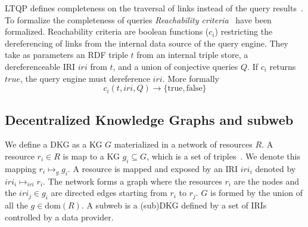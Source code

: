 LTQP defines completeness on the traversal of links instead of the query results~\cite{Hartig2012}.
To formalize the completeness of queries \emph{Reachability criteria}~\cite{Hartig2012} have been formalized.
Reachability criteria are boolean functions ($c_i$) restricting the dereferencing of links from the internal data source of the query engine.
They take as parameters an RDF triple $t$ from an internal triple store, a dereferenceable IRI $iri$ from $t$, and a union of conjective queries $Q$.
If $c_i$ returns $true$, the query engine must dereference $iri$.
More formally
\begin{equation}\label{eq:reachabilityCriteria}
c_i(t, iri, Q) \rightarrow \{\mathrm{true}, \mathrm{false}\}
\end{equation}

\subsection{Decentralized Knowledge Graphs and subweb}\label{sec:dkg}

We define a DKG as a KG $G$ materialized in a network of resources $R$.
A resource $r_i \in R$ is map to a KG $g_i \subseteq G$, which is a set of triples~\cite{w3ConceptsAbstract}.
We denote this mapping $r_i \mapsto_{g} g_i$.
A resource is mapped and exposed by an IRI $iri_i$ denoted by $iri_i \mapsto_{iri} r_i$.
The network forms a graph where the resources $r_i$ are the nodes and the $iri_j \in g_i$ are directed edges starting from $r_i$ to $r_j$.
$G$ is formed by the union of all the $g \in \text{dom}(R)$.%
A subweb is a (sub)DKG defined by a set of IRIs controlled by a data provider.